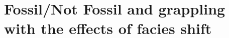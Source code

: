 \documentclass{beamer}
\begin{document}
\section{Fossil/Not Fossil and grappling with the effects of facies shift}

\begin{frame}
\end{frame}

\begin{frame}
\end{frame}

\begin{frame}
\end{frame}
\end{document}

